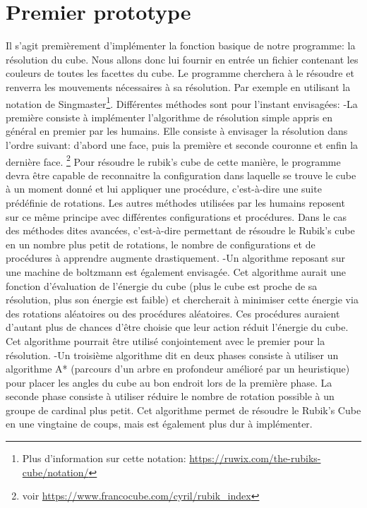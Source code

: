 \documentclass[a4paper]{report}
\begin{document}
\section{Premier prototype}
Il s'agit premièrement d'implémenter la fonction basique de notre programme: la résolution du cube. Nous allons donc lui fournir en entrée un fichier contenant les couleurs de toutes les facettes du cube. Le programme cherchera à le résoudre et renverra les mouvements nécessaires à sa résolution. Par exemple en utilisant la notation de Singmaster\footnote{Plus d'information sur cette notation: \url{https://ruwix.com/the-rubiks-cube/notation/}}.
Différentes méthodes sont pour l'instant envisagées:
    -La première consiste à implémenter l'algorithme de résolution simple appris en général en premier par les humains. Elle consiste à envisager la résolution dans l'ordre suivant: d'abord une face, puis la première et seconde couronne et enfin la dernière face. \footnote {voir \url{https://www.francocube.com/cyril/rubik_index}} Pour résoudre le rubik's cube de cette manière, le programme devra être capable de reconnaitre la configuration dans laquelle se trouve le cube à un moment donné et lui
    appliquer une procédure, c'est-à-dire une suite prédéfinie de rotations. Les autres méthodes utilisées par les humains reposent sur ce même principe avec différentes configurations et procédures. Dans le cas des méthodes dites avancées, c'est-à-dire permettant de résoudre le Rubik's cube en un nombre plus petit de rotations, le nombre de configurations et de procédures à apprendre augmente drastiquement.
	-Un algorithme reposant sur une machine de boltzmann est également envisagée. Cet algorithme aurait une fonction d'évaluation de l'énergie du cube (plus le cube est proche de sa résolution, plus son énergie est faible) et chercherait à minimiser cette énergie via des rotations aléatoires ou des procédures aléatoires. Ces procédures auraient d'autant plus de chances d'être choisie que leur action réduit l'énergie du cube. Cet algorithme pourrait être utilisé conjointement avec le premier pour la résolution.
	-Un troisième algorithme dit en deux phases consiste à utiliser un algorithme A* (parcours d'un arbre en profondeur amélioré par un heuristique) pour placer les angles du cube au bon endroit lors de la première phase. La seconde phase consiste à utiliser réduire le nombre de rotation possible à un groupe de cardinal plus petit. Cet algorithme permet de résoudre le Rubik's Cube en une vingtaine de coups, mais est également plus dur à implémenter.
\end{document}
